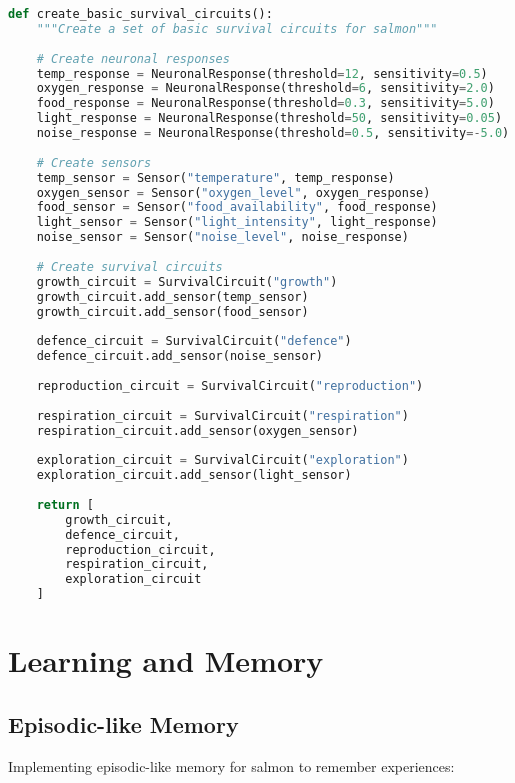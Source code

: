 \documentclass[11pt,a4paper]{article}
\begin{document}
\begin{lstlisting}[language=Python]
def create_basic_survival_circuits():
    """Create a set of basic survival circuits for salmon"""
    
    # Create neuronal responses
    temp_response = NeuronalResponse(threshold=12, sensitivity=0.5)
    oxygen_response = NeuronalResponse(threshold=6, sensitivity=2.0)
    food_response = NeuronalResponse(threshold=0.3, sensitivity=5.0)
    light_response = NeuronalResponse(threshold=50, sensitivity=0.05)
    noise_response = NeuronalResponse(threshold=0.5, sensitivity=-5.0)
    
    # Create sensors
    temp_sensor = Sensor("temperature", temp_response)
    oxygen_sensor = Sensor("oxygen_level", oxygen_response)
    food_sensor = Sensor("food_availability", food_response)
    light_sensor = Sensor("light_intensity", light_response)
    noise_sensor = Sensor("noise_level", noise_response)
    
    # Create survival circuits
    growth_circuit = SurvivalCircuit("growth")
    growth_circuit.add_sensor(temp_sensor)
    growth_circuit.add_sensor(food_sensor)
    
    defence_circuit = SurvivalCircuit("defence")
    defence_circuit.add_sensor(noise_sensor)
    
    reproduction_circuit = SurvivalCircuit("reproduction")
    
    respiration_circuit = SurvivalCircuit("respiration")
    respiration_circuit.add_sensor(oxygen_sensor)
    
    exploration_circuit = SurvivalCircuit("exploration")
    exploration_circuit.add_sensor(light_sensor)
    
    return [
        growth_circuit, 
        defence_circuit, 
        reproduction_circuit,
        respiration_circuit,
        exploration_circuit
    ]
\end{lstlisting}

\section{Learning and Memory}
\subsection{Episodic-like Memory}

Implementing episodic-like memory for salmon to remember experiences:
\end{document}
